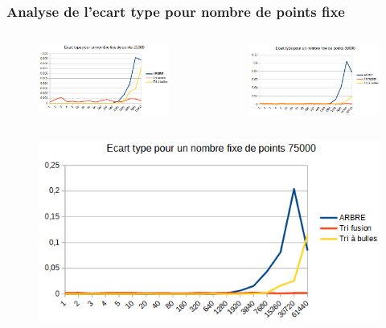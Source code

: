 \documentclass{beamer}
\begin{document}
\begin{frame}
\frametitle{Analyse de l'ecart type pour nombre de points fixe}
\begin{columns}
    \begin{figure}
      \includegraphics[width=\textwidth]{Beamer/ET_NB_25000.png}
    \end{figure}

    \begin{figure}
      \includegraphics[width=\textwidth]{Beamer/ET_NB_50000.png}
    \end{figure}
\end{columns}

  \begin{columns}
    \begin{figure}
      \includegraphics[width=\textwidth]{Beamer/ET_NB_75000.png}
    \end{figure}


\end{columns}
\end{frame}
\end{document}
